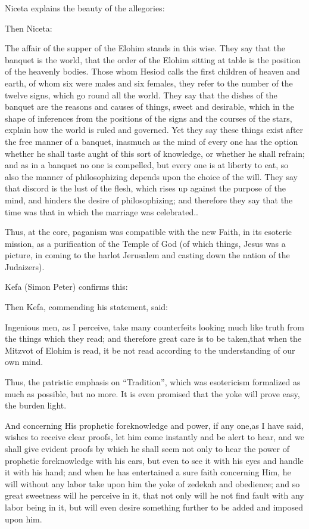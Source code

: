 Niceta explains the beauty of the allegories:

Then Niceta:

\begin{quotex}
The affair of the supper of the Elohim stands in this wise. They say that the banquet is the world, that the order of the Elohim sitting at table is the position of the heavenly bodies. Those whom Hesiod calls the first children of heaven and earth, of whom six were males and six females, they refer to the number of the twelve signs, which go round all the world. They say that the dishes of the banquet are the reasons and causes of things, sweet and desirable, which in the shape of inferences from the positions of the signs and the courses of the stars, explain how the world is ruled and governed. Yet they say these things exist after the free manner of a banquet, inasmuch as the mind of every one has the option whether he shall taste aught of this sort of knowledge, or whether he shall refrain; and as in a banquet no one is compelled, but every one is at liberty to eat, so also the manner of philosophizing depends upon the choice of the will. They say that discord is the lust of the flesh, which rises up against the purpose of the mind, and hinders the desire of philosophizing; and therefore they say that the time was that in which the marriage was celebrated..
\end{quotex}


Thus, at the core, paganism was compatible with the new Faith, in its esoteric mission, as a purification of the Temple of God (of which things, Jesus was a picture, in coming to the harlot Jerusalem and casting down the nation of the Judaizers).

Kefa (Simon Peter) confirms this:

Then Kefa, commending his statement, said:

\begin{quotex}
Ingenious men, as I perceive, take many counterfeits looking much like truth from the things which they read; and therefore great care is to be taken,that when the Mitzvot of Elohim is read, it be not read according to the understanding of our own mind.
\end{quotex}


Thus, the patristic emphasis on ``Tradition'', which was esotericism formalized as much as possible, but no more. It is even promised that the yoke will prove easy, the burden light.

\begin{quotex}
And concerning His prophetic foreknowledge and power, if any one,as I have said, wishes to receive clear proofs, let him come instantly and be alert to hear, and we shall give evident proofs by which he shall seem not only to hear the power of prophetic foreknowledge with his ears, but even to see it with his eyes and handle it with his hand; and when he has entertained a sure faith concerning Him, he will without any labor take upon him the yoke of zedekah and obedience; and so great sweetness will he perceive in it, that not only will he not find fault with any labor being in it, but will even desire something further to be added and imposed upon him.
\end{quotex}


